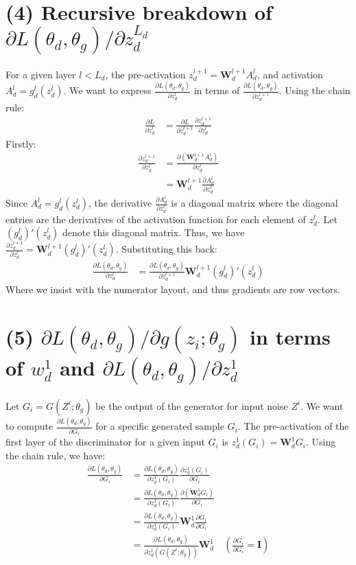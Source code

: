 \documentclass[11pt, a4paper, oneside]{memoir}
\begin{document}
\section*{(4) Recursive breakdown of $\partial L(\theta_d, \theta_g) / \partial z_d^{L_d}$}
For a given layer $l < L_d$, the pre-activation $z^{l+1}_d = \mathbf{W}^{l+1}_d A^l_d$, and activation $A^l_d = g^l_d(z^l_d)$.
We want to express $\frac{\partial L (\theta_d, \theta_g)}{\partial z^l_d}$
in terms of $\frac{\partial L(\theta_d,\theta_g)}{\partial z^{l+1}_d}$.
Using the chain rule:
\begin{align*}
\frac{\partial L}{\partial z^l_d} &= \frac{\partial L}{\partial z^{l+1}_d} \frac{\partial z^{l+1}_d}{\partial z^l_d}
\end{align*}
Firstly: 
\begin{align*}
\frac{\partial z^{l+1}_d}{\partial z^l_d} &= \frac{\partial (\mathbf{W}^{l+1}_d A^l_d)}{\partial z^l_d} \\
&= \mathbf{W}^{l+1}_d \frac{\partial A^l_d}{\partial z^l_d}
\end{align*}
Since $A^l_d = g^l_d(z^l_d)$, the derivative $\frac{\partial A^l_d}{\partial z^l_d}$ is a diagonal matrix where the diagonal entries are the derivatives of the activation function for each element of $z^l_d$. Let $(g^l_d)'(z^l_d)$ denote this diagonal matrix.
Thus, we have $\frac{\partial z^{l+1}_d}{\partial z^l_d} = \mathbf{W}^{l+1}_d (g^l_d)'(z^l_d)$.
Substituting this back:
\begin{align*}
\frac{\partial L (\theta_d, \theta_g)}{\partial z^l_d} &=  \frac{\partial L(\theta_d,\theta_g)}{\partial z^{l+1}_d} \mathbf{W}^{l+1}_d (g^l_d)'(z^l_d)
\end{align*}
Where we insist with the numerator layout, and thus gradients are row vectors.

\section*{(5) $\partial L(\theta_d, \theta_g) / \partial g(z_i; \theta_g)$ in terms of $w^1_d$ and $\partial L(\theta_d, \theta_g) / \partial z^1_d$}
Let $G_i = G(Z^i; \theta_g)$ be the output of the generator for input noise $Z^i$.
We want to compute $\frac{\partial L (\theta_d, \theta_g)}{\partial G_i}$ for a specific generated sample $G_i$.
The pre-activation of the first layer of the discriminator for a given input $G_i$ is $z^1_d(G_i) = \mathbf{W}^1_d G_i$.
Using the chain rule, we have:
\begin{align*}
    \frac{\partial L(\theta_d, \theta_g)}{\partial G_i} &= \frac{\partial L(\theta_d, \theta_g)}{\partial z^1_d(G_i)} \frac{\partial z^1_d(G_i)}{\partial G_i} \\
    &= \frac{\partial L(\theta_d, \theta_g)}{\partial z^1_d(G_i)} \frac{\partial (\mathbf{W}^1_d G_i)}{\partial G_i} \\
    &= \frac{\partial L(\theta_d, \theta_g)}{\partial z^1_d(G_i)} \mathbf{W}^1_d \frac{\partial G_i}{\partial G_i} \\
    &= \frac{\partial L(\theta_d, \theta_g)}{\partial z^1_d(G(Z^i; \theta_g))} \mathbf{W}^1_d \quad (\frac{\partial G_i}{\partial G_i} = \mathbf{I}) 
\end{align*}
\end{document}
